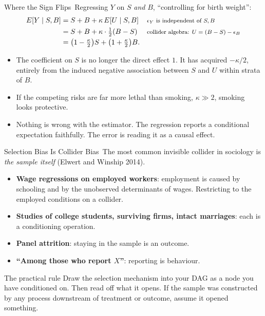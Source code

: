 \documentclass[aspectratio=169,11pt,xcolor=dvipsnames]{beamer}
\newcommand{\srcp}[1]{{\scriptsize\color{gray}(#1)}}
\newcommand{\E}{E}
\newcommand{\adv}{\,\raisebox{0.6pt}{\textcolor{accent}{$\bigstar$}}}
\newcommand{\core}{\,\raisebox{0.6pt}{\textcolor{corestar}{$\bigstar$}}}
\begin{document}
\begin{frame}{Where the Sign Flips\adv}
Regressing $Y$ on $S$ \emph{and} $B$, ``controlling for birth weight'':
\begin{align*}
  \E[Y \mid S, B]
  &= S + B + \kappa\,\E[U \mid S, B]
  && \text{\footnotesize $\epsilon_Y$ is independent of $S, B$} \\
  &= S + B + \kappa \cdot \tfrac12 (B - S)
  && \text{\footnotesize collider algebra: $U = (B - S) - \epsilon_B$} \\
  &= \big(1 - \tfrac{\kappa}{2}\big) S + \big(1 + \tfrac{\kappa}{2}\big) B .
\end{align*}
\vskip3pt
\begin{itemize}\itemsep3pt
  \item The coefficient on $S$ is no longer the direct effect $1$. It has
        acquired $-\kappa/2$, entirely from the induced negative association
        between $S$ and $U$ within strata of $B$.
  \item If the competing risks are far more lethal than smoking,
        $\kappa \gg 2$, smoking looks \alert{protective}.
  \item \alert{Nothing is wrong with the estimator.} The regression reports a
        conditional expectation faithfully. The error is reading it as a
        causal effect.
\end{itemize}
\end{frame}

\begin{frame}{Selection Bias Is Collider Bias\core}
The most common invisible collider in sociology is \emph{the sample itself}
\srcp{Elwert and Winship 2014}.
\begin{itemize}\itemsep3pt
  \item \textbf{Wage regressions on employed workers}: employment is caused by
        schooling and by the unobserved determinants of wages. Restricting to
        the employed conditions on a collider.
  \item \textbf{Studies of college students, surviving firms, intact
        marriages}: each is a conditioning operation.
  \item \textbf{Panel attrition}: staying in the sample is an outcome.
  \item \textbf{``Among those who report $X$''}: reporting is behaviour.
\end{itemize}
\vskip3pt
\begin{alertblock}{The practical rule}
Draw the selection mechanism into your DAG as a node you have conditioned on.
Then read off what it opens. If the sample was constructed by any process
downstream of treatment or outcome, assume it opened something.
\end{alertblock}
\end{frame}
\end{document}
